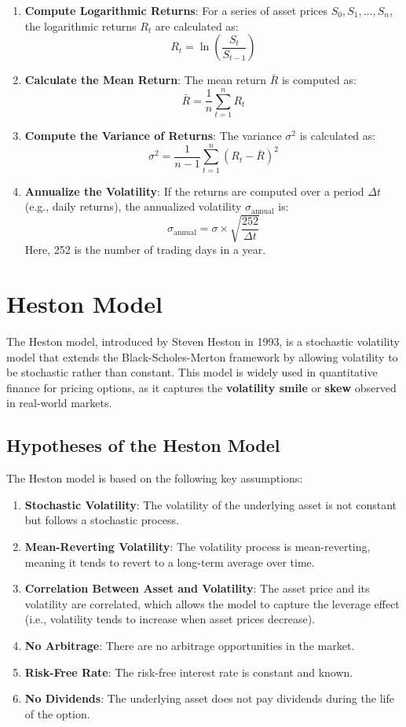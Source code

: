 \documentclass[11pt, oneside, a4paper, titlepage]{report}
\begin{document}
\begin{enumerate}
    \item \textbf{Compute Logarithmic Returns}:
    For a series of asset prices $S_0, S_1, \dots, S_n$, the logarithmic returns $R_t$ are calculated as:
    \[
    R_t = \ln\left(\frac{S_t}{S_{t-1}}\right)
    \]
    \item \textbf{Calculate the Mean Return}:
    The mean return $\bar{R}$ is computed as:
    \[
    \bar{R} = \frac{1}{n} \sum_{t=1}^n R_t
    \]
    \item \textbf{Compute the Variance of Returns}:
    The variance $\sigma^2$ is calculated as:
    \[
    \sigma^2 = \frac{1}{n-1} \sum_{t=1}^n (R_t - \bar{R})^2
    \]
    \item \textbf{Annualize the Volatility}:
    If the returns are computed over a period $\Delta t$ (e.g., daily returns), the annualized volatility $\sigma_{\text{annual}}$ is:
    \[
    \sigma_{\text{annual}} = \sigma \times \sqrt{\frac{252}{\Delta t}}
    \]
    Here, 252 is the number of trading days in a year.
\end{enumerate}

\section{Heston Model}

The Heston model, introduced by Steven Heston in 1993, is a stochastic volatility model that extends the Black-Scholes-Merton framework by allowing volatility to be stochastic rather than constant. This model is widely used in quantitative finance for pricing options, as it captures the \textbf{volatility smile} or \textbf{skew} observed in real-world markets.

\subsection{Hypotheses of the Heston Model}

The Heston model is based on the following key assumptions:
\begin{enumerate}
    \item \textbf{Stochastic Volatility}: The volatility of the underlying asset is not constant but follows a stochastic process.
    \item \textbf{Mean-Reverting Volatility}: The volatility process is mean-reverting, meaning it tends to revert to a long-term average over time.
    \item \textbf{Correlation Between Asset and Volatility}: The asset price and its volatility are correlated, which allows the model to capture the leverage effect (i.e., volatility tends to increase when asset prices decrease).
    \item \textbf{No Arbitrage}: There are no arbitrage opportunities in the market.
    \item \textbf{Risk-Free Rate}: The risk-free interest rate is constant and known.
    \item \textbf{No Dividends}: The underlying asset does not pay dividends during the life of the option.
\end{enumerate}
\end{document}

